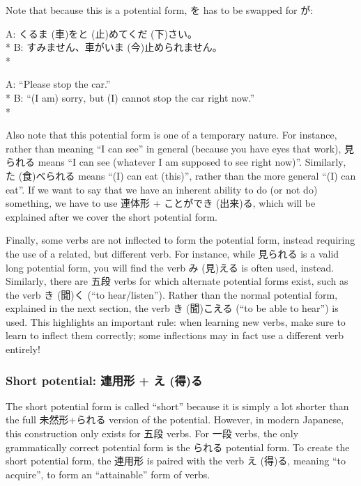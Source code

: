 \documentclass[11pt, b5paper, twoside, openright, onecolumn]{book}
\makeatletter
\newcommand*{\rubystack}[2]{{\relscale{0.5}%
  \begin{tabular}[b]{@{}c@{}}%
    {#1}\\%
   {\textscale{2}{#2}}%
  \end{tabular}}%
}
\DeclareRobustCommand*{\ruby}[2]{%
  \mbox{%
    \setlength{\parskip}{0ex}%
    \BeginAccSupp{method=pdfstringdef,ActualText={#1}}%
      \rubystack{\phantom{#2}}{#1}%
      \llap{%
        \rubystack{#2}{\phantom{#1}}%
      }%
    \EndAccSupp{}%
  }%
}
\renewcommand*{\ruby}[2]{#2 (#1)}%
\newenvironment{exampleblock}{
\setlength{\parindent}{0.6in}
\begin{minipage}[t]{\dimexpr\textwidth-\parindent}}
{\end{minipage}}
\makeatother
\begin{document}
Note that because this is a potential form‚ を has to be swapped for が:

\vspace{0.4cm}
\begin{exampleblock}
A: \ruby{車}{くるま}を\ruby{止}{と}めて\ruby{下}{くだ}さい。 \\* 
B: すみません、車が\ruby{今}{いま}止められません。 \\* 
\end{exampleblock}
\vspace{0.2cm}

\begin{exampleblock}
A: “Please stop the car.” \\* 
B: “(I am) sorry‚ but (I) cannot stop the car right now.” \\* 
\end{exampleblock}
\vspace{0.2cm}

Also note that this potential form is one of a temporary nature. For instance‚ rather than meaning “I can see” in general (because you have eyes that work)‚ 見られる means “I can see (whatever I am supposed to see right now)”. Similarly‚ \ruby{食}{た}べられる means “(I) can eat (this)”‚ rather than the more general “(I) can eat”. If we want to say that we have an inherent ability to do (or not do) something‚ we have to use 連体形 + ことが\ruby{出来}{でき}る‚ which will be explained after we cover the short potential form.

Finally‚ some verbs are not inflected to form the potential form‚ instead requiring the use of a related‚ but different verb. For instance‚ while 見られる is a valid long potential form‚ you will find the verb \ruby{見}{み}える is often used‚ instead. Similarly‚ there are 五段 verbs for which alternate potential forms exist‚ such as the verb \ruby{聞}{き}く (“to hear/listen”). Rather than the normal potential form‚ explained in the next section‚ the verb \ruby{聞}{き}こえる (“to be able to hear”) is used. This highlights an important rule: when learning new verbs‚ make sure to learn to inflect them correctly; some inflections may in fact use a different verb entirely!

\subsubsection{Short potential: 連用形 + \ruby{得}{え}る}

The short potential form is called “short” because it is simply a lot shorter than the full 未然形+られる version of the potential. However‚ in modern Japanese‚ this construction only exists for 五段 verbs. For 一段 verbs‚ the only grammatically correct potential form is the られる potential form. To create the short potential form‚ the 連用形 is paired with the verb \ruby{得}{え}る‚ meaning “to acquire”‚ to form an “attainable” form of verbs.
\end{document}
